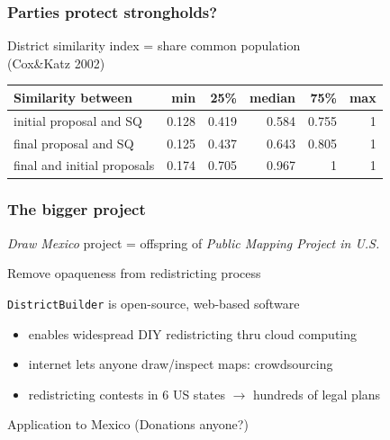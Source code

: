 \documentclass[xcolor=dvipsnames]{beamer}  %
\begin{document}
\begin{frame}
    \frametitle{Parties protect strongholds?}

District similarity index = share common population \\ (Cox\&Katz 2002)

\bigskip

\begin{center}
\begin{footnotesize}
  \begin{tabular}{lrrrrr}
  Similarity between          &   min  &  25\%  & median &  75\% &  max \\ \hline
  initial proposal and SQ     & 0.128  & 0.419  & 0.584  & 0.755 &  1   \\
  final proposal and SQ       & 0.125  & 0.437  & 0.643  & 0.805 &  1   \\
  final and initial proposals & 0.174  & 0.705  & 0.967  & 1     &  1   \\
  \end{tabular}
\end{footnotesize}
\end{center}
\end{frame}
\begin{frame}\label{fr:MxMapProj}                      %

    \frametitle{The bigger project}

\emph{Draw Mexico} project = offspring of \emph{Public Mapping Project in U.S.}

\bigskip

Remove opaqueness from redistricting process 

\bigskip

\texttt{DistrictBuilder} is open-source, web-based software %

\begin{itemize}

\item enables widespread DIY redistricting thru cloud computing

\item  internet lets anyone draw/inspect maps: crowdsourcing

\item redistricting contests in 6 US states $\rightarrow$ hundreds of legal plans

\end{itemize}

\bigskip

Application to \alert{Mexico} \href{http://23.21.151.172/}{} (Donations anyone?) 

\end{frame}
\end{document}
